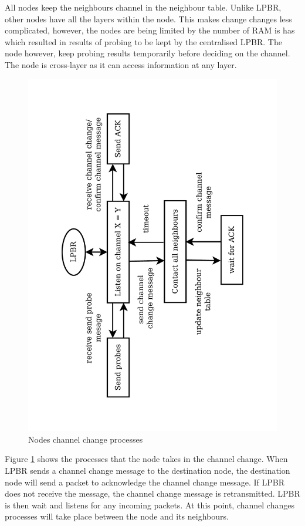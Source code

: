 All nodes keep the neighbours channel in the neighbour table. Unlike LPBR, other nodes have all the layers within the node. This makes change changes less complicated, however, the nodes are being limited by the number of RAM is has which resulted in results of probing to be kept by the centralised LPBR. The node however, keep probing results temporarily before deciding on the channel. The node is cross-layer as it can access information at any layer.

\begin{figure}
\centering
\includegraphics[trim=2cm 2cm 2.5cm 2cm, clip=true, totalheight=0.58\textheight, angle=270]{otherNodes.pdf}
\caption{Nodes channel change processes}
\label{fig_otherNodes}
\end{figure}

Figure \ref{fig_otherNodes} shows the processes that the node takes in the channel change. When LPBR sends a channel change message to the destination node, the destination node will send a packet to acknowledge the channel change message. If LPBR does not receive the message, the channel change message is retransmitted. LPBR is then wait and listens for any incoming packets. At this point, channel changes processes will take place between the node and its neighbours.

